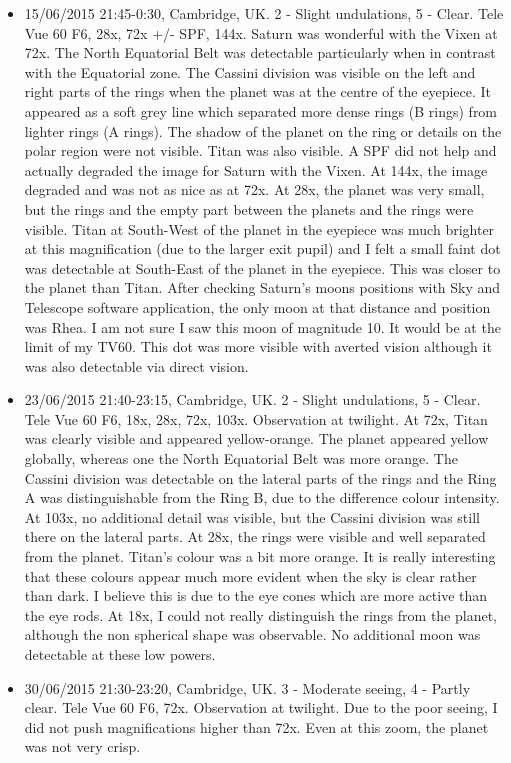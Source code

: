 \begin{itemize}
\item 15/06/2015 21:45-0:30, Cambridge, UK. 2 - Slight undulations, 5 - Clear. Tele Vue 60 F6, 28x, 72x +/- SPF, 144x. Saturn was wonderful with the Vixen at 72x. The North Equatorial Belt was detectable particularly when in contrast with the Equatorial zone. The Cassini division was visible on the left and right parts of the rings when the planet was at the centre of the eyepiece. It appeared as a soft grey line which separated more dense rings (B rings) from lighter rings (A rings). The shadow of the planet on the ring or details on the polar region were not visible. Titan was also visible. A SPF did not help and actually degraded the image for Saturn with the Vixen. At 144x, the image degraded and was not as nice as at 72x. At 28x, the planet was very small, but the rings and the empty part between the planets and the rings were visible. Titan at South-West of the planet in the eyepiece was much brighter at this magnification (due to the larger exit pupil) and I felt a small faint dot was detectable at South-East of the planet in the eyepiece. This was closer to the planet than Titan. After checking Saturn's moons positions with Sky and Telescope software application, the only moon at that distance and position was Rhea. I am not sure I saw this moon of magnitude 10. It would be at the limit of my TV60. This dot was more visible with averted vision although it was also detectable via direct vision.
\item 23/06/2015 21:40-23:15, Cambridge, UK. 2 - Slight undulations, 5 - Clear. Tele Vue 60 F6, 18x, 28x, 72x, 103x. Observation at twilight. At 72x, Titan was clearly visible and appeared yellow-orange. The planet appeared yellow globally, whereas one the North Equatorial Belt was more orange. The Cassini division was detectable on the lateral parts of the rings and the Ring A was distinguishable from the Ring B, due to the difference colour intensity. At 103x, no additional detail was visible, but the Cassini division was still there on the lateral parts. At 28x, the rings were visible and well separated from the planet. Titan's colour was a bit more orange. It is really interesting that these colours appear much more evident when the sky is clear rather than dark. I believe this is due to the eye cones which are more active than the eye rods. At 18x, I could not really distinguish the rings from the planet, although the non spherical shape was observable. No additional moon was detectable at these low powers. 
\item 30/06/2015 21:30-23:20, Cambridge, UK. 3 - Moderate seeing, 4 - Partly clear. Tele Vue 60 F6, 72x. Observation at twilight. Due to the poor seeing, I did not push magnifications higher than 72x. Even at this zoom, the planet was not very crisp. 

\end{itemize}
